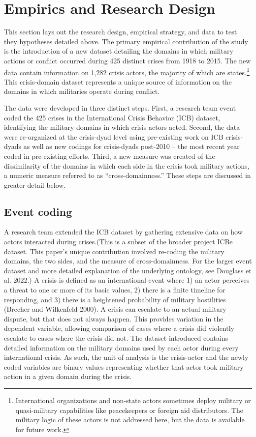 \documentclass[
]{article}
\begin{document}
\hypertarget{empirics-and-research-design}{%
\section{Empirics and Research Design}\label{empirics-and-research-design}}

This section lays out the research design, empirical strategy, and data to test they hypotheses detailed above. The primary empirical contribution of the study is the introduction of a new dataset detailing the domains in which military actions or conflict occurred during 425 distinct crises from 1918 to 2015. The new data contain information on 1,282 crisis actors, the majority of which are states.\footnote{International organizations and non-state actors sometimes deploy military or quasi-military capabilities like peacekeepers or foreign aid distributors. The military logic of these actors is not addressed here, but the data is available for future work.} This crisis-domain dataset represents a unique source of information on the domains in which militaries operate during conflict.

The data were developed in three distinct steps. First, a research team event coded the 425 crises in the International Crisis Behavior (ICB) dataset, identifying the military domains in which crisis actors acted. Second, the data were re-organized at the crisis-dyad level using pre-existing work on ICB crisis-dyads as well as new codings for crisis-dyads post-2010 -- the most recent year coded in pre-existing efforts. Third, a new measure was created of the dissimilarity of the domains in which each side in the crisis took military actions, a numeric measure referred to as ``cross-domainness.'' These steps are discussed in greater detail below.

\hypertarget{event-coding}{%
\subsection{Event coding}\label{event-coding}}

A research team extended the ICB dataset by gathering extensive data on how actors interacted during crises.(This is a subset of the broader project ICBe dataset. This paper's unique contribution involved re-coding the military domains, the two sides, and the measure of cross-domainness. For the larger event dataset and more detailed explanation of the underlying ontology, see Douglass et al. 2022.) A crisis is defined as an international event where 1) an actor perceives a threat to one or more of its basic values, 2) there is a finite timeline for responding, and 3) there is a heightened probability of military hostilities (Brecher and Wilkenfeld 2000). A crisis can escalate to an actual military dispute, but that does not always happen. This provides variation in the dependent variable, allowing comparison of cases where a crisis did violently escalate to cases where the crisis did not. The dataset introduced contains detailed information on the military domains used by each actor during every international crisis. As such, the unit of analysis is the crisis-actor and the newly coded variables are binary values representing whether that actor took military action in a given domain during the crisis.
\end{document}
